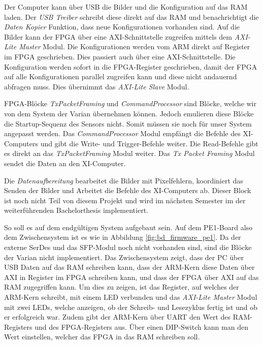 \documentclass{article}
\begin{document}
Der Computer kann über USB die Bilder und die Konfiguration auf das RAM laden. Der \textit{USB Treiber} schreibt diese direkt auf das RAM und benachrichtigt die \textit{Daten Kopier} Funktion, dass neue Konfigurationen vorhanden sind. Auf die Bilder kann der FPGA über eine AXI-Schnittstelle zugreifen mittels dem \textit{AXI-Lite Master} Modul. Die Konfigurationen werden vom ARM direkt auf Register im FPGA geschrieben. Dies passiert auch über eine AXI-Schnittstelle. Die Konfiguration werden sofort in die FPGA-Register geschrieben, damit der FPGA auf alle Konfigurationen parallel zugreifen kann und diese nicht andauernd abfragen muss. Dies übernimmt das \textit{AXI-Lite Slave} Modul.

FPGA-Blöcke \textit{TxPacketFraming} und \textit{CommandProcessor} sind Blöcke, welche wir von dem System der Varian übernehmen können. Jedoch emulieren diese Blöcke die Startup-Sequenz des Sensors nicht. Somit müssen sie noch für unser System angepasst werden. Das \textit{CommandProcessor} Modul empfängt die Befehle des XI-Computers und gibt die Write- und Trigger-Befehle weiter. Die Read-Befehle gibt es direkt an das \textit{TxPacketFraming} Modul weiter. 
Das \textit{Tx Packet Framing} Modul sendet die Daten an den XI-Computer.

Die \textit{Datenaufbereitung} bearbeitet die Bilder mit Pixelfehlern, koordiniert das Senden der Bilder und Arbeitet die Befehle des XI-Computers ab. Dieser Block ist noch nicht Teil von diesem Projekt und wird im nächsten Semester im der weiterführenden Bachelorthesis implementiert.

So soll es auf dem endgültigen System aufgebaut sein. Auf dem PE1-Board also dem Zwischensystem ist es wie in Abbildung \ref{fig:bd_firmware_pe1}. Da der externe SerDes und das SFP-Modul noch nicht vorhanden sind, sind die Blöcke der Varian nicht implementiert. Das Zwischensystem zeigt, dass der PC über USB Daten auf das RAM schreiben kann, dass der ARM-Kern diese Daten über AXI in Register im FPGA schreiben kann, und dass der FPGA über AXI auf das RAM zugegriffen kann. Um dies zu zeigen, ist das Register, auf welches der ARM-Kern schreibt, mit einem LED verbunden und das \textit{AXI-Lite Master} Modul mit zwei LEDs, welche anzeigen, ob der Schreib- und Lesezyklus fertig ist und ob er erfolgreich war. Zudem gibt der ARM-Kern über UART den Wert des RAM-Registers und des FPGA-Registers aus. Über einen DIP-Switch kann man den Wert einstellen, welcher das FPGA in das RAM schreiben soll. 
\end{document}
